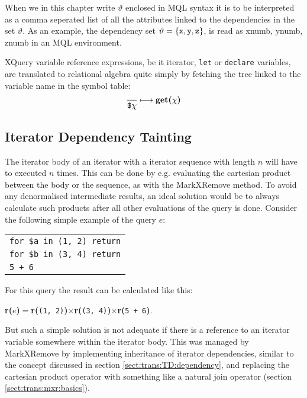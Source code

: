 When we in this chapter write $\vartheta$ enclosed in MQL syntax it is to be interpreted as a comma seperated list
of all the attributes linked to the dependencies in the set $\vartheta$. As an example, the dependency set
$\vartheta = \left\{\mbox{\texttt{x}},\mbox{\texttt{y}},\mbox{\texttt{z}}\right\}$, is read as \textsf{xnumb,
ynumb, znumb} in an MQL environment.

XQuery variable reference expressions, be it iterator, \texttt{let} or \texttt{declare} variables, are translated
to relational algebra quite simply by fetching the tree linked to the variable name in the symbol table:
\begin{equation}
\frac{}{\mbox{\texttt{\$}}\chi}\longmapsto
\mbox{\textbf{get(}}\chi\mbox{\textbf{)}}
\end{equation}


\subsection{Iterator Dependency Tainting}
\label{sect:trans:TD:tainting}

The iterator body of an iterator with a iterator sequence with length $n$ will have to executed $n$ times. This
can be done by e.g. evaluating the cartesian product between the body or the sequence, as with the MarkXRemove
method. To avoid any denormalised intermediate results, an ideal solution would be to always calculate such
products after all other evaluations of the query is done. Consider the following simple example of the query $e$:

\begin{center}
\begin{tabular}{l}
\texttt{for \$a in (1, 2) return} \\ \qquad
\texttt{for \$b in (3, 4) return} \\ \qquad \qquad
\texttt{5 + 6}
\end{tabular}
\end{center}

For this query the result can be calculated like this:
\noindent
\begin{center}
\textbf{r(}$e$\textbf{)}$=$\textbf{r(}\texttt{(1, 2)}\textbf{)}$\times$\textbf{r(}\texttt{(3,
4)}\textbf{)}$\times$\textbf{r(}\texttt{5 + 6}\textbf{)}.
\end{center}
\noindent

But such a simple solution is not adequate if there is a reference to an iterator variable somewhere within the
iterator body. This was managed by MarkXRemove by implementing inheritance of iterator dependencies, similar to
the concept discussed in section \ref{sect:trans:TD:dependency}, and replacing the cartesian product operator with
something like a natural join operator (section \ref{sect:trans:mxr:basics}).

